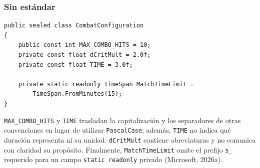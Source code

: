 \newpage
\subsubsection{Sin estándar}

\begin{lstlisting}[style=csharpstyle]
public sealed class CombatConfiguration
{
    public const int MAX_COMBO_HITS = 10;
    private const float dCritMult = 2.0f;
    private const float TIME = 3.0f;

    private static readonly TimeSpan MatchTimeLimit =
        TimeSpan.FromMinutes(15);
}
\end{lstlisting}

\texttt{MAX\_COMBO\_HITS} y \texttt{TIME} trasladan la capitalización y los separadores de otras convenciones en lugar de utilizar \texttt{PascalCase}; además, \texttt{TIME} no indica qué duración representa ni su unidad. \texttt{dCritMult} contiene abreviaturas y no comunica con claridad su propósito. Finalmente, \texttt{MatchTimeLimit} omite el prefijo \texttt{s\_} requerido para un campo \texttt{static readonly} privado (Microsoft, 2026a).
